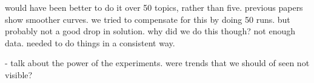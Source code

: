 would have been better to do it over 50 topics, rather than five.
previous papers show smoother curves.
we tried to compensate for this by doing 50 runs.
but probably not a good drop in solution.
why did we do this though? not enough data. needed to do things in a consistent way.

- talk about the power of the experiments. were trends that we should of seen not visible?




%
%
%
%
%

